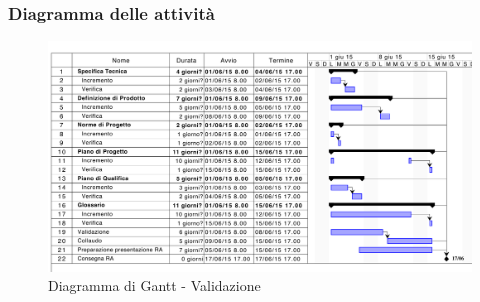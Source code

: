 		\subsubsection{Diagramma delle attività} %
		\label{ssub:diagramma_delle_attivita}
			\begin{figure}[htbp]
				\centering
				\centerline{\includegraphics[scale=0.7]{images/d_attivita_validazione.pdf}}
				\caption{Diagramma di Gantt - Validazione}
				\label{fig:gantt_validazione}
			\end{figure}
	
	
